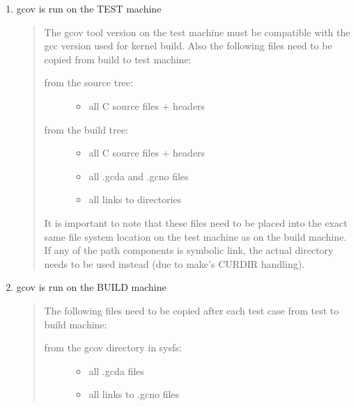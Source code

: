 \documentclass[a4paper,8pt,english]{sphinxmanual}
\begin{document}
\begin{enumerate}
\item {} 
gcov is run on the TEST machine
\begin{quote}

The gcov tool version on the test machine must be compatible with the
gcc version used for kernel build. Also the following files need to be
copied from build to test machine:
\begin{description}
\item[{from the source tree:}] \leavevmode\begin{itemize}
\item {} 
all C source files + headers

\end{itemize}

\item[{from the build tree:}] \leavevmode\begin{itemize}
\item {} 
all C source files + headers

\item {} 
all .gcda and .gcno files

\item {} 
all links to directories

\end{itemize}

\end{description}

It is important to note that these files need to be placed into the
exact same file system location on the test machine as on the build
machine. If any of the path components is symbolic link, the actual
directory needs to be used instead (due to make's CURDIR handling).
\end{quote}

\item {} 
gcov is run on the BUILD machine
\begin{quote}

The following files need to be copied after each test case from test
to build machine:
\begin{description}
\item[{from the gcov directory in sysfs:}] \leavevmode\begin{itemize}
\item {} 
all .gcda files

\item {} 
all links to .gcno files

\end{itemize}


\end{description}
\end{quote}
\end{enumerate}
\end{document}

